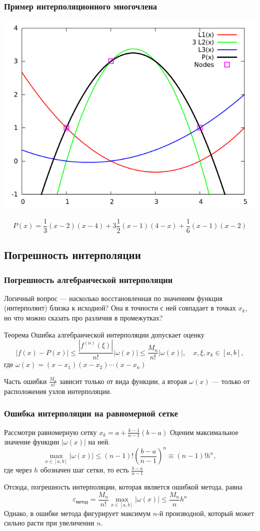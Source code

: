 \documentclass[aspectratio=169,unicode]{beamer}
\begin{document}
\begin{frame}
\frametitle{Пример интерполяционного многочлена}
	\begin{center}
	\includegraphics[height=0.65\textheight]{lp.png}
	\end{center}
	\[
		P(x) = \frac{1}{3}(x-2)(x-4) + 3\frac{1}{2}(x-1)(4-x) + \frac{1}{6}(x-1)(x-2)
	\]
\end{frame}

\subsection{Погрешность интерполяции}
\begin{frame}
\frametitle{Погрешность алгебраической интерполяции}
	Логичный вопрос --- насколько восстановленная по значениям функция (интерполянт)
	близка к исходной? Она в точности с ней совпадает в точках $x_k$, но что можно сказать
	про различия в промежутках?
	\pause

	\begin{block}{Теорема}
	Ошибка алгебраической интерполяции допускает оценку
	$$
	\left| f(x) - P(x) \right| \leqslant \frac{|f^{(n)}(\xi)|}{n!}|\omega(x)| \leqslant \frac{M_n}{n!} |\omega(x)|, \quad x,\xi,x_k \in [a,b],
	$$
	где $\omega(x) = (x-x_1)(x-x_2)\cdots(x-x_n)$
	\end{block}
	\pause
	Часть ошибки $\frac{M_n}{n!}$ зависит только от вида функции, а вторая $\omega(x)$ ---
	только от расположения узлов интерполяции.
\end{frame}

\begin{frame}
\frametitle{Ошибка интерполяции на равномерной сетке}
	Рассмотри равномерную сетку $x_k = a + \frac{k-1}{n-1} (b-a)$
	Оценим максимальное значение функции $|\omega(x)|$ на ней.
	\[
	\max_{x \in [a,b]} |\omega(x)| \leqslant (n-1)!
		\left(\frac{b-a}{n-1}\right)^n \equiv (n-1)! h^n,
	\]
	где через $h$ обозначен шаг сетки, то есть $\frac{b-a}{n-1}$
	\pause

	Отсюда, погрешность интерполяции, которая является ошибкой метода, равна
	\[
	\varepsilon_{\text{метод}} = \frac{M_n}{n!} \max_{x \in [a,b]}| \omega(x) |
		\leqslant \frac{M_n}{n} h^n
	\]
	Однако, в ошибке метода фигурирует максимум $n$-й производной, который
	может сильно расти при увеличении $n$.
\end{frame}
\end{document}
